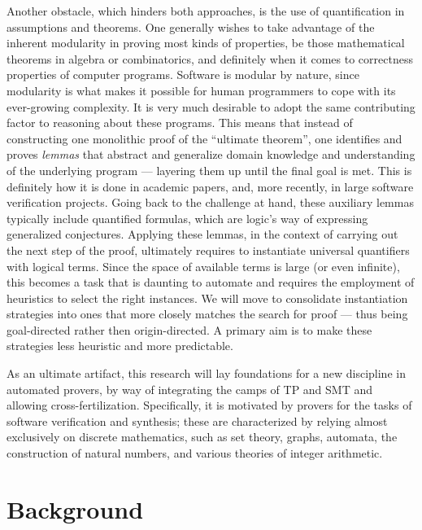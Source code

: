 Another obstacle, which hinders both approaches, is the use of quantification
in assumptions and theorems.
One generally wishes to take advantage of the inherent modularity in proving
most kinds of properties, be those mathematical theorems in algebra or combinatorics,
and definitely when it comes to correctness properties of computer programs.
Software is modular by nature, since modularity is what makes it possible
for human programmers to cope with its ever-growing complexity.
It is very much desirable to adopt the same contributing factor to reasoning about
these programs.
This means that instead of constructing one monolithic proof of the ``ultimate
theorem'', one identifies and proves \emph{lemmas} that abstract and generalize
domain knowledge and understanding of the underlying program --- layering them
up until the final goal is met.
This is definitely how it is done in academic papers, and, more recently, in
large software verification projects.
Going back to the challenge at hand, these auxiliary lemmas typically include
quantified formulas, which are logic's way of expressing generalized conjectures.
Applying these lemmas, \eg in the context of carrying out the next step of the proof,
ultimately requires to instantiate universal quantifiers with logical terms.
Since the space of available terms is large (or even infinite), this becomes
a task that is daunting to automate and requires the employment of heuristics
to select the right instances.
We will move to consolidate instantiation strategies into ones that more closely
matches the search for proof --- thus being goal-directed rather then origin-directed.
A primary aim is to make these strategies less heuristic and more predictable.

As an ultimate artifact, this research will lay foundations for a new discipline
in automated provers, by way of integrating the camps of TP and SMT and allowing
cross-fertilization.
Specifically, it is motivated by provers for the tasks of software verification
and synthesis; these are characterized by relying almost exclusively on discrete
mathematics, such as set theory, graphs, automata, the construction of
natural numbers, and various theories of integer arithmetic.


\section{Background}

